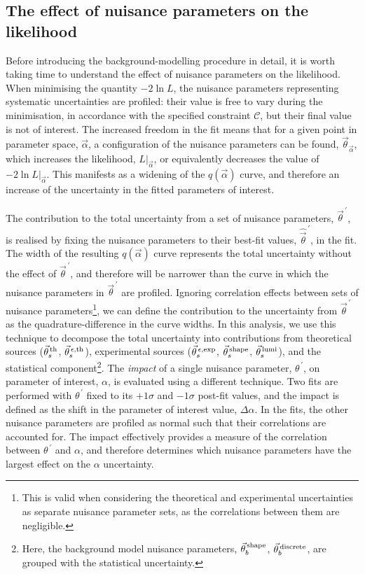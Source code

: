 \subsection{The effect of nuisance parameters on the likelihood}\label{sec:effect_of_nuisance}
Before introducing the background-modelling procedure in detail, it is worth taking time to understand the effect of nuisance parameters on the likelihood. When minimising the quantity $-2\ln{L}$, the nuisance parameters representing systematic uncertainties are profiled: their value is free to vary during the minimisation, in accordance with the specified constraint $\mathcal{C}$, but their final value is not of interest. The increased freedom in the fit means that for a given point in parameter space, $\vec{\alpha}$, a configuration of the nuisance parameters can be found, $\vec{\theta}_{\vec{\alpha}}$, which increases the likelihood, $L|_{\vec{\alpha}}$, or equivalently decreases the value of $-2\ln{L}|_{\vec{\alpha}}$. This manifests as a widening of the $q(\vec{\alpha})$ curve, and therefore an increase of the uncertainty in the fitted parameters of interest.

The contribution to the total uncertainty from a set of nuisance parameters, $\vec{\theta}^{\,'}$, is realised by fixing the nuisance parameters to their best-fit values, $\hat{\vec{\theta}}^{\,'}$, in the fit. The width of the resulting $q(\vec{\alpha})$ curve represents the total uncertainty without the effect of $\vec{\theta}^{\,'}$, and therefore will be narrower than the curve in which the nuisance parameters in $\vec{\theta}^{\,'}$ are profiled. Ignoring correlation effects between sets of nuisance parameters\footnote{This is valid when considering the theoretical and experimental uncertainties as separate nuisance parameter sets, as the correlations between them are negligible.}, we can define the contribution to the uncertainty from $\vec{\theta}^{\,'}$ as the quadrature-difference in the curve widths. In this analysis, we use this technique to decompose the total uncertainty into contributions from theoretical sources ($\vec{\theta}^{\,\rm{th}}_{s}$, $\vec{\theta}^{\,\epsilon,{\rm{th}}}_{s}$), experimental sources ($\vec{\theta}^{\,\epsilon,{\rm{exp}}}_{s}$, $\vec{\theta}^{\,\rm{shape}}_{s}$, $\vec{\theta}^{\,\rm{lumi}}_{s}$), and the statistical component\footnote{Here, the background model nuisance parameters, $\vec{\theta}^{\,\rm{shape}}_{b}$, $\vec{\theta}^{\,\rm{discrete}}_{b}$, are grouped with the statistical uncertainty.}. The \textit{impact} of a single nuisance parameter, $\theta^{\,'}$, on parameter of interest, $\alpha$, is evaluated using a different technique. Two fits are performed with $\theta^{\,'}$ fixed to its $+1\sigma$ and $-1\sigma$ post-fit values, and the impact is defined as the shift in the parameter of interest value, $\Delta\alpha$. In the fits, the other nuisance parameters are profiled as normal such that their correlations are accounted for. The impact effectively provides a measure of the correlation between $\theta^{\,'}$ and $\alpha$, and therefore determines which nuisance parameters have the largest effect on the $\alpha$ uncertainty.

